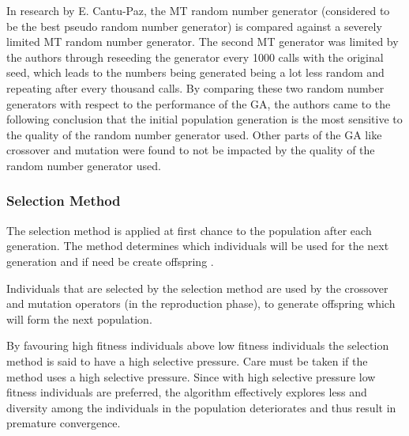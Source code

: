 In research by E. Cantu-Paz, the \gls{MT} random number generator (considered to be the best pseudo random number generator) is compared against a severely limited \gls{MT} random number generator\cite{OnRandomGA}. The second \gls{MT} generator was limited by the authors through reseeding the generator every 1000 calls with the original seed, which leads to the numbers being generated being a lot less random and repeating after every thousand calls\cite{OnRandomGA, RLRandomGA}. By comparing these two random number generators with respect to the performance of the \gls{GA}, the authors came to the following conclusion that the initial population generation is the most sensitive to the quality of the random number generator used\cite{OnRandomGA}. Other parts of the \gls{GA} like crossover and mutation were found to not be impacted by the quality of the random number generator used\cite{OnRandomGA, RLRandomGA}.

\subsubsection{Selection Method}
\label{sec:selectionmethod}
The selection method is applied at first chance to the population after each generation. The method determines which individuals will be used for the next generation and if need be create offspring \cite{CoactiveFuzzyGA,CombinedBranchBoundGA,ConstrainedGA}.

Individuals that are selected by the selection method are used by the crossover and mutation operators (in the reproduction phase), to generate offspring which will form the next population\cite{AdaptiveSAGA,AcceleratingGA}.

By favouring high fitness individuals above low fitness individuals the selection method is said to have a high selective pressure\cite{CompuIntelligenceIntro}. Care must be taken if the method uses a high selective pressure. Since with high selective pressure low fitness individuals are preferred, the algorithm effectively explores less and diversity among the individuals in the population deteriorates and thus result in premature convergence\cite{ConstrainedGA, CompuIntelligenceIntro}.

